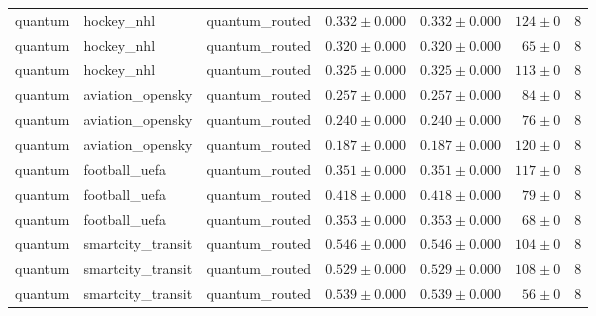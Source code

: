 \begin{table}[htbp]
\begin{tabular}{l l l r r r r}
quantum & hockey\_nhl & quantum\_routed & $0.332\pm0.000$ & $0.332\pm0.000$ & $124\pm0$ & 8 \\
quantum & hockey\_nhl & quantum\_routed & $0.320\pm0.000$ & $0.320\pm0.000$ & $65\pm0$ & 8 \\
quantum & hockey\_nhl & quantum\_routed & $0.325\pm0.000$ & $0.325\pm0.000$ & $113\pm0$ & 8 \\
quantum & aviation\_opensky & quantum\_routed & $0.257\pm0.000$ & $0.257\pm0.000$ & $84\pm0$ & 8 \\
quantum & aviation\_opensky & quantum\_routed & $0.240\pm0.000$ & $0.240\pm0.000$ & $76\pm0$ & 8 \\
quantum & aviation\_opensky & quantum\_routed & $0.187\pm0.000$ & $0.187\pm0.000$ & $120\pm0$ & 8 \\
quantum & football\_uefa & quantum\_routed & $0.351\pm0.000$ & $0.351\pm0.000$ & $117\pm0$ & 8 \\
quantum & football\_uefa & quantum\_routed & $0.418\pm0.000$ & $0.418\pm0.000$ & $79\pm0$ & 8 \\
quantum & football\_uefa & quantum\_routed & $0.353\pm0.000$ & $0.353\pm0.000$ & $68\pm0$ & 8 \\
quantum & smartcity\_transit & quantum\_routed & $0.546\pm0.000$ & $0.546\pm0.000$ & $104\pm0$ & 8 \\
quantum & smartcity\_transit & quantum\_routed & $0.529\pm0.000$ & $0.529\pm0.000$ & $108\pm0$ & 8 \\
quantum & smartcity\_transit & quantum\_routed & $0.539\pm0.000$ & $0.539\pm0.000$ & $56\pm0$ & 8 \\
\hline
\end{tabular}
\end{table}
